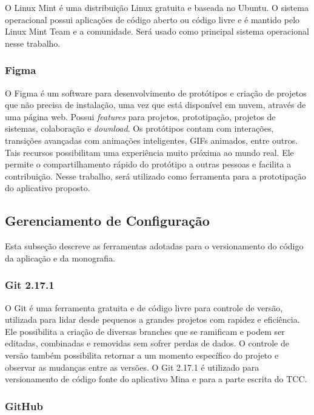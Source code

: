 O Linux Mint \cite{lm2020} é uma distribuição Linux gratuita e baseada no Ubuntu. O sistema operacional possui aplicações de código aberto ou código livre e é mantido pelo Linux Mint Team e a comunidade. Será usado como principal sistema operacional nesse trabalho.

\subsubsection{Figma}

O Figma \cite{figma2020} é um software para desenvolvimento de protótipos e 
criação de projetos que não precisa de instalação, uma vez que está disponível 
em nuvem, através de uma página web. Possui \emph{features} para projetos, prototipação, 
projetos de sistemas, colaboração e \emph{download}. Os protótipos contam com 
interações, transições avançadas com animações inteligentes, GIFs animados, 
entre outros. Tais recursos possibilitam uma experiência muito próxima ao mundo 
real. Ele permite o compartilhamento rápido do protótipo a outras pessoas e 
facilita a contribuição. Nesse trabalho, será utilizado como ferramenta para a 
prototipação do aplicativo proposto. 

\subsection{Gerenciamento de Configuração}

Esta subseção descreve as ferramentas adotadas para o versionamento do código da aplicação e da monografia.


\subsubsection{Git 2.17.1}

O Git \cite{git2020} é uma ferramenta gratuita e de código livre para controle 
de versão, utilizada para lidar desde pequenos a grandes projetos com rapidez e 
eficiência. Ele possibilita a criação de diversas branches que se ramificam e 
podem ser editadas, combinadas e removidas sem sofrer perdas de dados. O controle de versão também possibilita retornar a um momento específico do projeto e observar as mudanças entre as versões. O Git 2.17.1 é utilizado para versionamento de código fonte do aplicativo Mina e para a parte escrita do TCC.


\subsubsection{GitHub}

